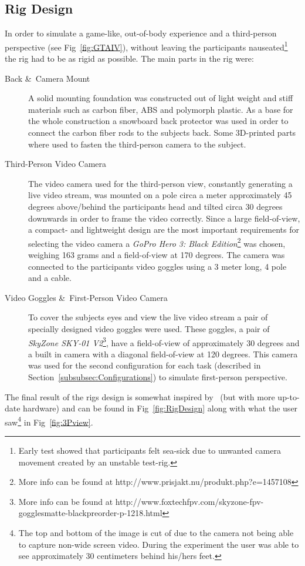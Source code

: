 \documentclass[runningheads,a4paper,oribibl]{llncs}
\begin{document}
\subsection{Rig Design}
In order to simulate a game-like, out-of-body experience and a third-person perspective (see Fig~\ref{fig:GTAIV}), without leaving the participants nauseated\footnote{Early test showed that participants felt sea-sick due to unwanted camera movement created by an unstable test-rig.} the rig had to be as rigid as possible. The main parts in the rig were:
\begin{description}
	\item[Back \&\ Camera Mount] A solid mounting foundation was constructed out of light weight and stiff materials such as carbon fiber, ABS and polymorph plastic. As a base for the whole construction a snowboard back protector was used in order to connect the carbon fiber rods to the subjects back. Some 3D-printed parts where used to fasten the third-person camera to the subject.

	\item[Third-Person Video Camera] The video camera used for the third-person view, constantly generating a live video stream, was mounted on a pole circa a meter approximately 45 degrees above/behind the participants head and tilted circa 30 degrees downwards in order to frame the video correctly. Since a large field-of-view, a compact- and lightweight design are the most important requirements for selecting the video camera a \emph{GoPro Hero 3: Black Edition}\footnote{More info can be found at http://www.prisjakt.nu/produkt.php?e=1457108} was chosen, weighing 163 grams and a field-of-view at 170 degrees. The camera was connected to the participants video goggles using a 3 meter long, 4 pole and a cable.

	\item[Video Goggles \&\ First-Person Video Camera] To cover the subjects eyes and view the live video stream a pair of specially designed video goggles were used. These goggles, a pair of \emph{SkyZone SKY-01 V2}\footnote{More info can be found at http://www.foxtechfpv.com/skyzone-fpv-gogglesmatte-blackpreorder-p-1218.html}, have a field-of-view of approximately 30 degrees and a built in camera with a diagonal field-of-view at 120 degrees. This camera was used for the second configuration for each task (described in Section~\ref{subsubsec:Configurations}) to simulate first-person perspective.
\end{description}
The final result of the rigs design is somewhat inspired by~\cite{salamin2010quantifying} (but with more up-to-date hardware) and can be found in Fig~\ref{fig:RigDesign} along with what the user saw\footnote{The top and bottom of the image is cut of due to the camera not being able to capture non-wide screen video. During the experiment the user was able to see approximately 30 centimeters behind his/hers feet.} in Fig~\ref{fig:3Pview}.
\end{document}
